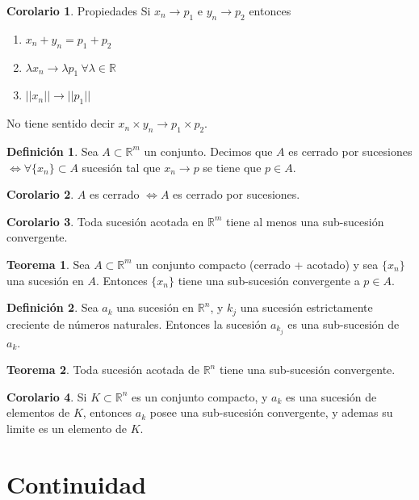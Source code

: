 \documentclass[10pt]{article}
\theoremstyle{definition}
\newtheorem{definition}{Definición}[section]
\newtheorem{theorem}{Teorema}[section]
\newtheorem{corollary}{Corolario}[theorem]
\begin{document}
\begin{corollary}{Propiedades}
        Si $x_n\to p_1$ e $y_n\to p_2$ entonces
        \begin{enumerate}
            \item $x_n+y_n=p_1+p_2$
            \item $\lambda x_n\to\lambda p_1\ \forall\lambda\in\mathbb{R}$
            \item $||x_n||\to ||p_1||$
        \end{enumerate}
        No tiene sentido decir $x_n\times y_n\to p_1\times p_2$.
\end{corollary}
\begin{definition}
    Sea $A\subset\mathbb{R}^m$ un conjunto. Decimos que $A$ es cerrado por sucesiones $\Leftrightarrow\forall\{x_n\}\subset A$ sucesión tal que $x_n\to p$ se tiene que $p\in A$.
\end{definition}
\begin{corollary}
    $A$ es cerrado $\Leftrightarrow A$ es cerrado por sucesiones.
\end{corollary}
\begin{corollary}
    Toda sucesión acotada en $\mathbb{R}^m$ tiene al menos una sub-sucesión convergente. 
\end{corollary}
\begin{theorem}
    Sea $A\subset\mathbb{R}^m$ un conjunto compacto (cerrado + acotado) y sea $\{x_n\}$ una sucesión en $A$. Entonces $\{x_n\}$ tiene una sub-sucesión convergente a $p\in A$.
\end{theorem}
\begin{definition}
    Sea $a_k$ una sucesión en $\mathbb{R}^n$, y $k_j$ una sucesión estrictamente creciente de números naturales. Entonces la sucesión $a_{k_j}$ es una sub-sucesión de $a_k$.
\end{definition}
\begin{theorem}
    Toda sucesión acotada de $\mathbb{R}^n$ tiene una sub-sucesión convergente.
\end{theorem}
\begin{corollary}
    Si $K\subset\mathbb{R}^n$ es un conjunto compacto, y $a_k$ es una sucesión de elementos de $K$, entonces $a_k$ posee una sub-sucesión convergente, y ademas su limite es un elemento de $K$.
\end{corollary}\newpage
\section{Continuidad}
\end{document}
